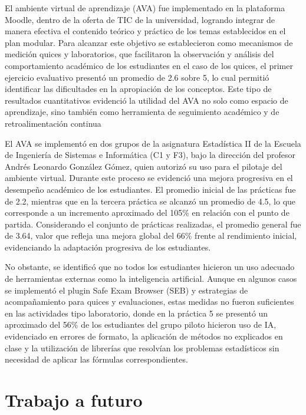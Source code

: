 \documentclass[letter,oneside,12pt,spanish]{report}
\begin{document}
El ambiente virtual de aprendizaje (AVA) fue implementado en la plataforma Moodle, dentro de la oferta de TIC de la universidad, logrando integrar de manera efectiva el contenido teórico y práctico de los temas establecidos en el plan modular. Para alcanzar este objetivo se establecieron como mecanismos de medición quices y laboratorios, que facilitaron la observación y análisis del comportamiento académico de los estudiantes en el caso de los quices, el primer ejercicio evaluativo presentó un promedio de 2.6 sobre 5, lo cual permitió identificar las dificultades en la apropiación de los conceptos. Este tipo de resultados cuantitativos evidenció la utilidad del AVA no solo como espacio de aprendizaje, sino también como herramienta de seguimiento académico y de retroalimentación continua

El AVA se implementó en dos grupos de la asignatura Estadística II de la Escuela de Ingeniería de Sistemas e Informática (C1 y F3), bajo la dirección del profesor Andrés Leonardo González Gómez, quien autorizó su uso para el pilotaje del ambiente virtual. Durante este proceso se evidenció una mejora progresiva en el desempeño académico de los estudiantes. El promedio inicial de las prácticas fue de 2.2, mientras que en la tercera práctica se alcanzó un promedio de 4.5, lo que corresponde a un incremento aproximado del 105\% en relación con el punto de partida. Considerando el conjunto de prácticas realizadas, el promedio general fue de 3.64, valor que refleja una mejora global del 66\% frente al rendimiento inicial, evidenciando la adaptación progresiva de los estudiantes.

No obstante, se identificó que no todos los estudiantes hicieron un uso adecuado de herramientas externas como la inteligencia artificial. Aunque en algunos casos se implementó el plugin Safe Exam Browser (SEB) y estrategias de acompañamiento para quices y evaluaciones, estas medidas no fueron suficientes en las actividades tipo laboratorio, donde en la práctica 5 se presentó un aproximado del 56\% de los estudiantes del grupo piloto hicieron uso de IA, evidenciado en errores de formato, la aplicación de métodos no explicados en clase y la utilización de librerías que resolvían los problemas estadísticos sin necesidad de aplicar las fórmulas correspondientes.



\section{Trabajo a futuro}
\end{document}
